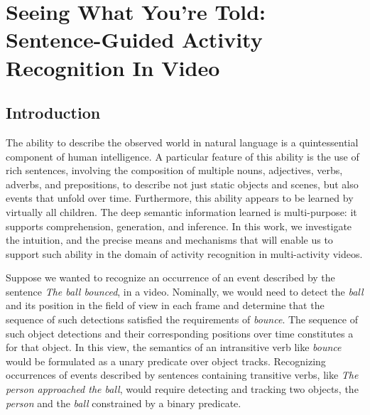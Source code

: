 \chapter{Seeing What You're Told: Sentence-Guided Activity Recognition In
  Video}
\label{chapter:cvpr2014e}

\section{Introduction}
\label{sec-st1:introduction}
%
The ability to describe the observed world in natural language is a
quintessential component of human intelligence.
%
A particular feature of this ability is the use of rich sentences, involving
the composition of multiple nouns, adjectives, verbs, adverbs, and
prepositions, to describe not just static objects and scenes, but also events
that unfold over time.
%
Furthermore, this ability appears to be learned by virtually all children.
%
The deep semantic information learned is multi-purpose: it supports
comprehension, generation, and inference.
%
In this work, we investigate the intuition, and the precise means and
mechanisms that will enable us to support such ability in the domain of
activity recognition in multi-activity videos.

Suppose we wanted to recognize an occurrence of an event described by the
sentence \emph{The ball bounced}, in a video.
%
Nominally, we would need to detect the \emph{ball} and its position in the
field of view in each frame and determine that the sequence of such detections
satisfied the requirements of \emph{bounce}.
%
The sequence of such object detections and their corresponding positions over
time constitutes a  for that object.
%
In this view, the semantics of an intransitive verb like \emph{bounce} would be
formulated as a unary predicate over object tracks.
%
Recognizing occurrences of events described by sentences containing transitive
verbs, like \emph{The person approached the ball}, would require detecting and
tracking two objects, the \emph{person} and the \emph{ball} constrained by a
binary predicate.

